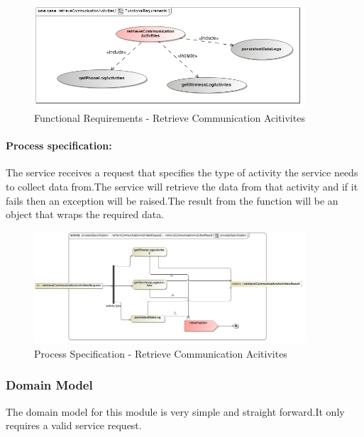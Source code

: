\documentclass[hidelinks, 12pt, oneside]{article}
\begin{document}
		\begin{figure}[!htbp]
    		\centering
    		\includegraphics[width=0.9\textwidth]{img/functionalRequirementsRetrieveCommunicationActivities.jpg}
    		\caption{Functional Requirements - Retrieve Communication Acitivites}
    		\label{fig:FunctionalReq_retrieveCommunicationAcitivites}
		\end{figure}	
		
		
			\newpage
			\paragraph{Process specification:}
			The  service receives a request that specifies the type of activity the service needs to collect data from.The service will retrieve the data from that activity and if it fails then an exception will be raised.The result from the function will be an object that wraps the required data.
			
			
			\begin{figure}[!htbp]
    		\centering
    		\includegraphics[width=0.9\textwidth]{img/processSpecificationRetrieveCommunicationActivities.jpg}
    		\caption{Process Specification - Retrieve Communication Acitivites}
    		\label{fig:ProcessSpec_retrieveCommunicationAcitivites}
		\end{figure}
		\newpage
	
		\subsubsection{Domain Model}
		The domain model for this module is very simple and straight forward.It only requires a valid service request.
		
\end{document}
